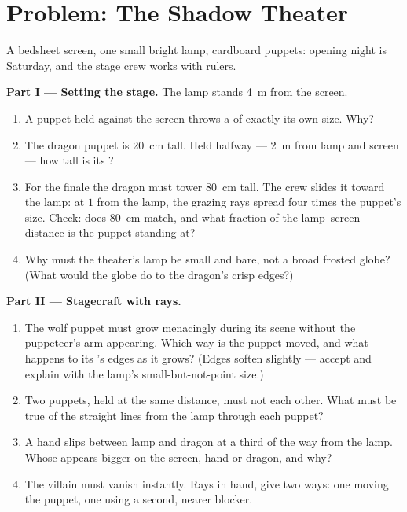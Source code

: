 \section{Problem: The Shadow Theater}

\begin{problem}\label{pb:g6:light-propagation:1}
A bedsheet screen, one small bright lamp, cardboard puppets:
opening night is Saturday, and the stage crew works with rulers.

\medskip\noindent\textbf{Part I --- Setting the stage.}
The lamp stands \qty{4}{m} from the screen.
\begin{enumerate}
  \item A puppet held against the screen throws a  of
        exactly its own size. Why?
  \item The dragon puppet is \qty{20}{cm} tall. Held halfway ---
        \qty{2}{m} from lamp and screen --- how tall is its
        ?
  \item For the finale the dragon must tower \qty{80}{cm} tall.
        The crew slides it toward the lamp: at $1$  from the
        lamp, the grazing rays spread four times the puppet's
        size. Check: does \qty{80}{cm} match, and what fraction
        of the lamp--screen distance is the puppet standing at?
  \item Why must the theater's lamp be small and bare, not a
        broad frosted globe? (What would the globe do to the
        dragon's crisp edges?)
\end{enumerate}

\medskip\noindent\textbf{Part II --- Stagecraft with rays.}
\begin{enumerate}[resume]
  \item The wolf puppet must grow menacingly during its scene
        without the puppeteer's arm appearing. Which way is the
        puppet moved, and what happens to its 's edges as
        it grows? (Edges soften slightly --- accept and explain
        with the lamp's small-but-not-point size.)
  \item Two puppets, held at the same distance, must not 
        each other. What must be true of the straight lines from
        the lamp through each puppet?
  \item A hand slips between lamp and dragon at a third of the
        way from the lamp. Whose  appears bigger on
        the screen, hand or dragon, and why?
  \item The villain must vanish instantly. Rays in hand, give two
        ways: one moving the puppet, one using a second, nearer
        blocker.
\end{enumerate}


\end{problem}
